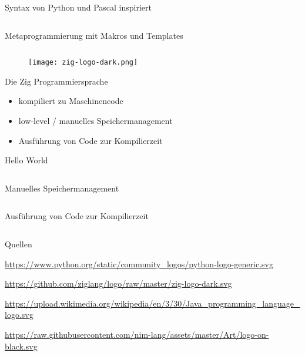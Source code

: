 \documentclass[aspectratio=169]{beamer}
\begin{document}
\begin{frame}{Syntax von Python und Pascal inspiriert}
  \inputminted[linenos]{nim}{examples/syntax.nim}
\end{frame}

\begin{frame}{Metaprogrammierung mit Makros und Templates}
  \inputminted[linenos]{nim}{examples/templates.nim}
\end{frame}

\begin{frame}{}
  \begin{figure}
    \centering
    \texttt{[image: zig-logo-dark.png]}
    \caption{\cite{zig_logo}}
    \label{fig:zig_logo}
  \end{figure}
\end{frame}

\begin{frame}{Die Zig Programmiersprache}
  \begin{itemize}
  \item kompiliert zu Maschinencode
  \item low-level / manuelles Speichermanagement
  \item Ausführung von Code zur Kompilierzeit
  \end{itemize}
\end{frame}

\begin{frame}{Hello World}
  \inputminted[linenos]{zig}{examples/hello.zig}
\end{frame}

\begin{frame}{Manuelles Speichermanagement}
  \inputminted[linenos]{zig}{examples/memory_management.zig}
\end{frame}

\begin{frame}{Ausführung von Code zur Kompilierzeit}
  \inputminted[linenos]{zig}{examples/comptime.zig}
\end{frame}

\begin{frame}{Quellen}
  \begin{thebibliography}{}
    \url{https://www.python.org/static/community_logos/python-logo-generic.svg}

    \url{https://github.com/ziglang/logo/raw/master/zig-logo-dark.svg}

    \url{https://upload.wikimedia.org/wikipedia/en/3/30/Java_programming_language_logo.svg}

    \url{https://raw.githubusercontent.com/nim-lang/assets/master/Art/logo-on-black.svg}

  \end{thebibliography}
\end{frame}
\end{document}
